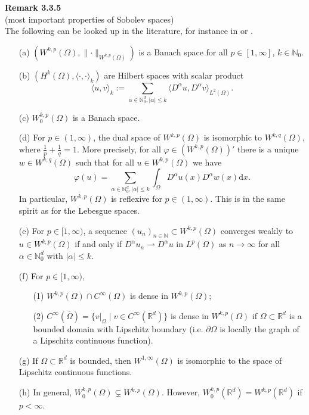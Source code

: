 \textbf{Remark 3.3.5}\\
(most important properties of Sobolev spaces)\\
The following can be looked up in the literature, for instance in \cite[Chapter 3 ??]{adams_fournier} or \cite[Part II, 5. Sobolev Spaces]{lawrence_evans}.
\begin{itemize}
	\item[(a)] $(W^{k,p}(\Omega),\lVert\cdot\rVert_{W^{k,p}(\Omega)})$ is a Banach space for all $p\in[1,\infty]$, $k\in\mathbb{N}_0$.
	\item[(b)] $(H^k(\Omega),\langle\cdot,\cdot\rangle_k)$ are Hilbert spaces with scalar product
	\[\langle u,v\rangle_k:=\sum_{\alpha\in\mathbb{N}_0^d,\lvert\alpha\rvert\leq k}{\langle D^\alpha u,D^\alpha v\rangle_{L^2(\Omega)}}.\]
	\item[(c)] $W_0^{k,p}(\Omega)$ is a Banach space.
	\item[(d)] For $p\in(1,\infty)$, the dual space of $W^{k,p}(\Omega)$ is isomorphic to $W^{k,q}(\Omega)$, where $\frac{1}{p}+\frac{1}{q}=1$. More precisely, for all $\varphi\in(W^{k,p}(\Omega))'$ there is a unique $w\in W^{k,q}(\Omega)$ such that for all $u\in W^{k,p}(\Omega)$ we have
	\[\varphi(u)=\sum_{\alpha\in\mathbb{N}_0^d,\lvert\alpha\vert\leq k}{\int_\Omega{D^\alpha u(x)D^\alpha w(x)\mathrm{d}x}}.\]
	In particular, $W^{k,p}(\Omega)$ is reflexive for $p\in(1,\infty)$. This is in the same spirit as for the Lebesgue spaces.
	\item[(e)] For $p\in[1,\infty)$, a sequence $(u_n)_{n\in\mathbb{N}}\subset W^{k,p}(\Omega)$ converges weakly to $u\in W^{k,p}(\Omega)$ if and only if $D^\alpha u_n\rightharpoonup D^\alpha u$ in $L^p(\Omega)$ as $n\to\infty$ for all $\alpha\in\mathbb{N}_0^d$ with $\lvert\alpha\rvert\leq k$.
	\item[(f)] For $p\in[1,\infty)$,
	\begin{itemize}
		\item[(1)] $W^{k,p}(\Omega)\cap C^\infty(\Omega)$ is dense in $W^{k,p}(\Omega)$;
		\item[(2)] $C^\infty(\overline{\Omega})=\{v|_\Omega\mid v\in C^\infty(\mathbb{R}^d)\}$ is dense in $W^{k,p}(\Omega)$ if $\Omega\subset\mathbb{R}^d$ is a bounded domain with Lipschitz boundary (i.e. $\partial\Omega$ is locally the graph of a Lipschitz continuous function).
	\end{itemize}
	\item[(g)] If $\Omega\subset\mathbb{R}^d$ is bounded, then $W^{1,\infty}(\Omega)$ is isomorphic to the space of Lipschitz continuous functions.
	\item[(h)] In general, $W_0^{k,p}(\Omega)\subsetneq W^{k,p}(\Omega)$. However, $W_0^{k,p}(\mathbb{R}^d)=W^{k,p}(\mathbb{R}^d)$ if $p<\infty$.\\[11pt]
\end{itemize}

